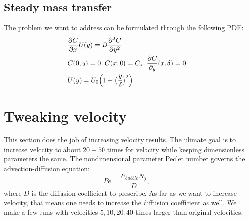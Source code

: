 \documentclass{article}
\newcommand{\beq}{\begin{equation}}
\newcommand{\feq}{\end{equation}}
\begin{document}
\subsection{Steady mass transfer}
The problem we want to address can be formulated through the following PDE:
\beq
\begin{aligned}
&\frac{\partial C}{\partial x} U(y)=D\frac{\partial^2 C}{\partial y^2}\\
&C(0,y)=0,\, C(x,0)=C_s,\, \frac{\partial C}{\partial_y }(x,\delta)=0\\
&U(y)=U_0 \Bigl(1-\bigl(\frac{y}{\delta}\bigr)^2\Bigr)
\end{aligned}
\feq


\section{Tweaking velocity}
This section does the job of increasing velocity results. The ulimate goal is to increase velocity
to about $20-50$ times for velocity while keeping dimensionless parameters the same. The
nondimensional parameter Peclet number governs the advection-diffusion equation:
\beq
Pe=\frac{U_{bubble} N_y}{D},
\feq
where $D$ is the diffusion coefficient to prescribe. As far as we want to increase velocity, that
means one needs to increase the diffusion coefficient as well. We make a few runs with velocities
$5,10,20,40$ times larger than original velocities. 




\end{document}
